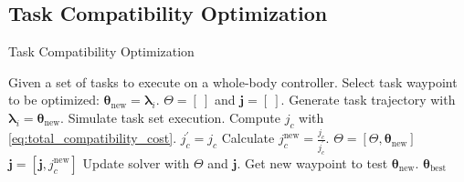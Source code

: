 \documentclass[12pt,a4paper,twoside]{article}
\newcommand{\bs}[1]{\boldsymbol{#1}}
\newcommand{\blam}{\bs{\lambda}}
\newcommand{\obj}{\bs{\theta}}
\newcommand{\Obj}{\Theta}
\begin{document}
\subsection{Task Compatibility Optimization}
\label{sec:task_compatibility_optimization}
\begin{algorithm}[!h]
    \caption{Task Compatibility Optimization}
    \label{algo:task_compatibility_optimization}
    \begin{algorithmic}[1]
        \State Given a set of tasks to execute on a whole-body controller.
        \State Select task waypoint to be optimized: $\obj_{\text{new}} = \blam_{i}$.
        \State $\Obj = [\ ]$ and $\bs{j} = [\ ]$.
        \Do
            \State Generate task trajectory with $\blam_{i} = \obj_{\text{new}}$.
            \State Simulate task set execution.
            \State Compute $j_{c}$ with \eqref{eq:total_compatibility_cost}.
                \State $j_{c}^{\prime} = j_{c}$
            \EndIf
            \State Calculate $j_{c}^{\text{new}} = \frac{j_{c}}{j_{c}^{\prime}}$.
            \State $\Obj = \left[\Obj, \obj_{\text{new}} \right]$
            \State $\bs{j} = \left[\bs{j}, j_{c}^{\text{new}} \right]$
            \State Update solver with $\Obj$ and $\bs{j}$.
            \State Get new waypoint to test $\obj_{\text{new}}$.
        \State\Return $\obj_{\text{best}}$
    \end{algorithmic}
\end{algorithm}
\end{document}
